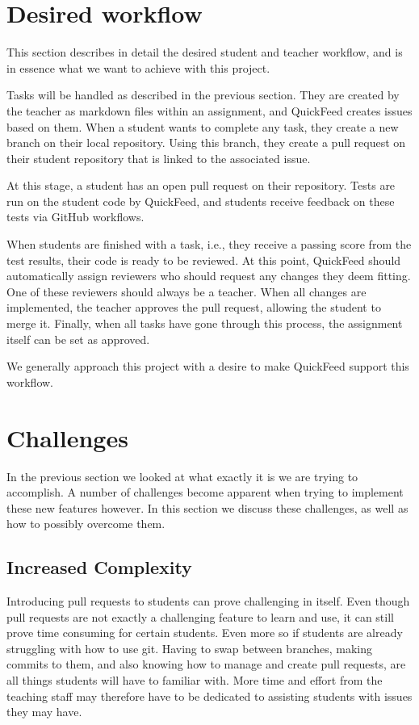 \section{Desired workflow}

This section describes in detail the desired student and teacher workflow, and is in essence what we want to achieve with this project.

Tasks will be handled as described in the previous section.
They are created by the teacher as markdown files within an assignment, and QuickFeed creates issues based on them.
When a student wants to complete any task, they create a new branch on their local repository.
Using this branch, they create a pull request on their student repository that is linked to the associated issue.

At this stage, a student has an open pull request on their repository.
Tests are run on the student code by QuickFeed, and students receive feedback on these tests via GitHub workflows.

When students are finished with a task, i.e., they receive a passing score from the test results, their code is ready to be reviewed.
At this point, QuickFeed should automatically assign reviewers who should request any changes they deem fitting.
One of these reviewers should always be a teacher.
When all changes are implemented, the teacher approves the pull request, allowing the student to merge it.
Finally, when all tasks have gone through this process, the assignment itself can be set as approved.

We generally approach this project with a desire to make QuickFeed support this workflow.

\section{Challenges}

In the previous section we looked at what exactly it is we are trying to accomplish. 
A number of challenges become apparent when trying to implement these new features however.
In this section we discuss these challenges, as well as how to possibly overcome them.

\subsection{Increased Complexity}

Introducing pull requests to students can prove challenging in itself.
Even though pull requests are not exactly a challenging feature to learn and use, it can still prove time consuming for certain students.
Even more so if students are already struggling with how to use git.
Having to swap between branches, making commits to them, and also knowing how to manage and create pull requests, are all things students will have to familiar with.
More time and effort from the teaching staff may therefore have to be dedicated to assisting students with issues they may have.


